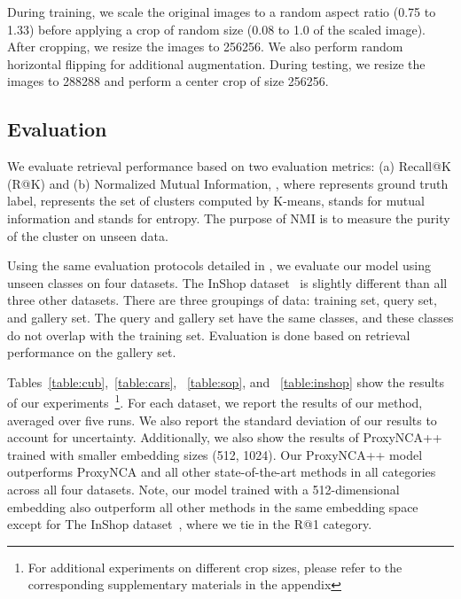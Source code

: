 \documentclass[runningheads]{llncs}
\begin{document}
During training, we scale the original images to a random aspect ratio (0.75 to 1.33) before applying a crop of random size (0.08 to 1.0 of the scaled image). After cropping, we resize the images to 256256. We also perform random horizontal flipping for additional augmentation. During testing, we resize the images to 288288 and perform a center crop of size 256256.


\subsection{Evaluation}

 We evaluate retrieval performance based on two evaluation metrics: (a) Recall@K (R@K) and (b) Normalized Mutual Information, , where  represents ground truth label,  represents the set of clusters computed by K-means,  stands for mutual information and  stands for entropy. The purpose of NMI is to measure the purity of the cluster on unseen data.

Using the same evaluation protocols detailed in \cite{movshovitz2017no,wang2019multi,jacob2019metric,liu2016deepfashion}, we evaluate our model using unseen classes on four datasets.
The InShop dataset~\cite{liu2016deepfashion} is slightly different than all three other datasets. There are three groupings of data: training set, query set, and gallery set. The query and gallery set have the same classes, and these classes do not overlap with the training set. Evaluation is done based on retrieval performance on the gallery set.

Tables~\ref{table:cub},~\ref{table:cars}, ~\ref{table:sop}, and ~\ref{table:inshop} show the results of our experiments~\footnote[1]{For additional experiments on different crop sizes, please refer to the corresponding supplementary materials in the appendix}.
For each dataset, we report the results of our method, averaged over five runs. We also report the standard deviation of our results to account for uncertainty.
Additionally, we also show the results of ProxyNCA++ trained with smaller embedding sizes (512, 1024).
Our ProxyNCA++ model outperforms ProxyNCA and all other state-of-the-art methods in all categories across all four datasets. Note, our model trained with a 512-dimensional embedding also outperform all other methods in the same embedding space except for The InShop dataset~\cite{liu2016deepfashion}, where we tie in the R@1 category.
\end{document}

